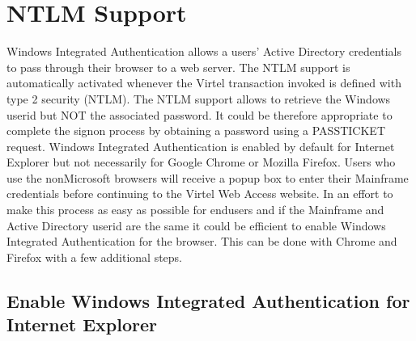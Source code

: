 \documentclass[letterpaper,10pt,english]{sphinxmanual}
\begin{document}
\ignorespaces 

\section{NTLM Support}
\label{\detokenize{Customization:ntlm-support}}\label{\detokenize{Customization:index-115}}
\sphinxAtStartPar
Windows Integrated Authentication allows a users’ Active Directory credentials to pass through their browser to a web server. The NTLM support is automatically activated whenever the Virtel transaction invoked is defined with type 2 security (NTLM). The NTLM support allows to retrieve the Windows userid but NOT the associated password. It could be therefore appropriate to complete the signon process by obtaining a password using a PASSTICKET request. Windows Integrated Authentication is enabled by default for Internet Explorer but not necessarily for Google Chrome or Mozilla Firefox. Users who use the non\sphinxhyphen{}Microsoft browsers will receive a pop\sphinxhyphen{}up box to enter their Mainframe credentials before continuing to the Virtel Web Access website. In an effort to make this process as easy as possible for end\sphinxhyphen{}users and if the Mainframe and Active Directory userid are the same it could be efficient to enable Windows Integrated Authentication for the browser. This can be done with Chrome and Firefox with a few additional steps.


\subsection{Enable Windows Integrated Authentication for Internet Explorer}
\label{\detokenize{Customization:enable-windows-integrated-authentication-for-internet-explorer}}
\end{document}
